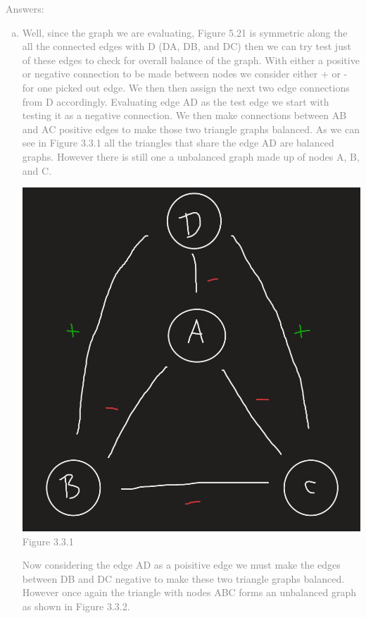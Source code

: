 \documentclass[11pt]{article}
\begin{document}
\textcolor{gray}{
Answers:
\begin{enumerate}[(a)]
	\item Well, since the graph we are evaluating, Figure 5.21 is symmetric along the all the connected edges with D (DA, DB, and DC) then we can try test just of these edges to check for overall balance of the graph.  With either a positive or negative connection to be made between nodes we consider either + or - for one picked out edge.  We then then assign the next two edge connections from D accordingly.  Evaluating edge AD as the test edge we start with testing it as a negative connection. We then make connections between AB and AC positive edges to make those two triangle graphs balanced. As we can see in Figure 3.3.1 all the triangles that share the edge AD are balanced graphs. However there is still one a unbalanced graph made up of nodes A, B, and C.\\
\begin{center}
	\includegraphics[scale=0.5]{Figure_3_3_1}\\
	Figure 3.3.1
\end{center}
Now considering the edge AD as a poisitive edge we must make the edges between DB and DC negative to make these two triangle graphs balanced.  However once again the triangle with nodes ABC forms an unbalanced graph as shown in Figure 3.3.2. \\

\end{enumerate}}
\end{document}
